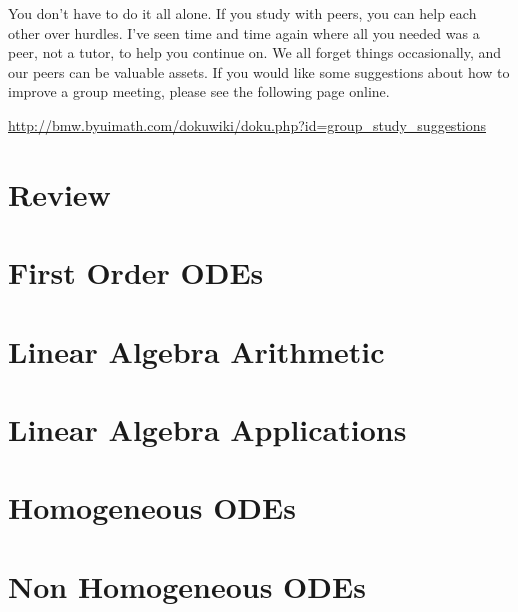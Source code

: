 \documentclass[letterpaper,oneside]{book}%
\theoremstyle{plain}
\theoremstyle{box}
\theoremstyle{problem}
\begin{document}
You don't have to do it all alone.  If you study with peers, you can help each other over hurdles. I've seen time and time again where all you needed was a peer, not a tutor, to help you continue on.  We all forget things occasionally, and our peers can be valuable assets.  If you would like some suggestions about how to improve a group meeting, please see the following page online.
\begin{center}
 \href{http://bmw.byuimath.com/dokuwiki/doku.php?id=group\_study\_suggestions}{http://bmw.byuimath.com/dokuwiki/doku.php?id=group\_study\_suggestions}
\end{center}
\mainmatter

\newcommand{\mysubsection}[1]{\subsection*{#1}\addcontentsline{toc}{subsection}{#1}}
\chapter{Review}





\chapter{First Order ODEs}




\chapter{Linear Algebra Arithmetic}





\chapter{Linear Algebra Applications}






\chapter{Homogeneous ODEs}





\chapter{Non Homogeneous ODEs}


\end{document}
